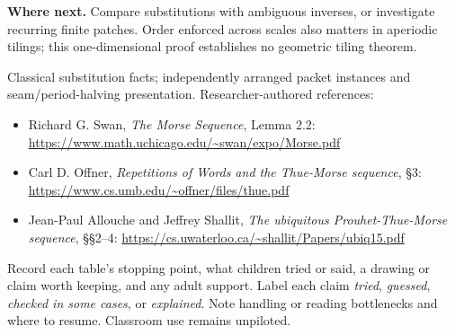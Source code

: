 \documentclass[11pt,letterpaper]{article}
\newcommand{\head}[1]{\par\vspace{5pt}{\large\bfseries #1}\par\nopagebreak\vspace{1pt}}
\begin{document}
\textbf{Where next.} Compare substitutions with ambiguous inverses, or investigate recurring finite patches. Order enforced across scales also matters in aperiodic tilings; this one-dimensional proof establishes no geometric tiling theorem.

\head{Source lineage}
Classical substitution facts; independently arranged packet instances and seam/period-halving presentation. Researcher-authored references:
\begin{itemize}
\item Richard G. Swan, \emph{The Morse Sequence}, Lemma 2.2: \url{https://www.math.uchicago.edu/~swan/expo/Morse.pdf}
\item Carl D. Offner, \emph{Repetitions of Words and the Thue-Morse sequence}, \S3: \url{https://www.cs.umb.edu/~offner/files/thue.pdf}
\item Jean-Paul Allouche and Jeffrey Shallit, \emph{The ubiquitous Prouhet-Thue-Morse sequence}, \S\S2--4: \url{https://cs.uwaterloo.ca/~shallit/Papers/ubiq15.pdf}
\end{itemize}

\head{After the session}
Record each table's stopping point, what children tried or said, a drawing or claim worth keeping, and any adult support. Label each claim \emph{tried}, \emph{guessed}, \emph{checked in some cases}, or \emph{explained}. Note handling or reading bottlenecks and where to resume. Classroom use remains unpiloted.
\end{document}

